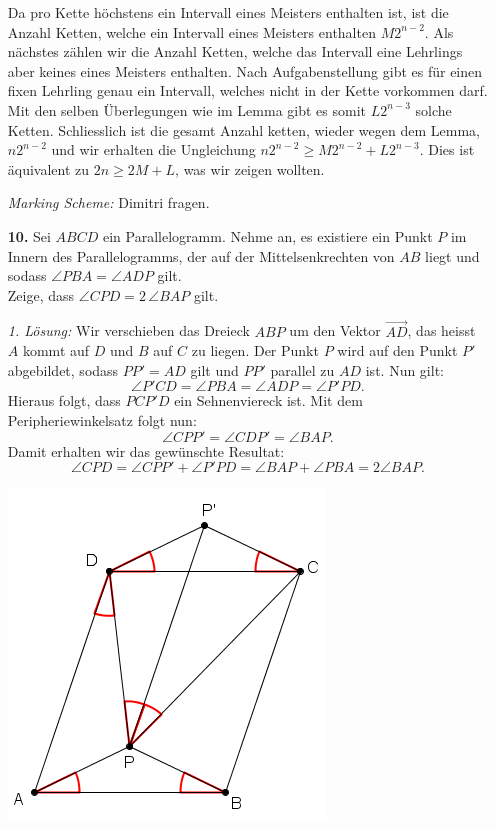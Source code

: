 \documentclass[language=german,style=solution]{smo}
\begin{document}
\begin{enumerate}
Da pro Kette höchstens ein Intervall eines Meisters enthalten ist, ist die Anzahl Ketten, welche ein Intervall eines Meisters enthalten $M2^{n-2}$.
Als nächstes zählen wir die Anzahl Ketten, welche das Intervall eine Lehrlings aber keines eines Meisters enthalten. Nach Aufgabenstellung gibt es für einen fixen Lehrling genau ein Intervall, welches nicht in der Kette vorkommen darf. Mit den selben Überlegungen wie im Lemma gibt es somit $L2^{n-3}$ solche Ketten. Schliesslich ist die gesamt Anzahl ketten, wieder wegen dem Lemma,  $n2^{n-2}$ und wir erhalten die Ungleichung  $n2^{n-2} \geq M2^{n-2}+L2^{n-3}$. Dies ist äquivalent zu $2n \geq 2M +L$, was wir zeigen wollten.

\textit{Marking Scheme:} Dimitri fragen.

\newpage

\item[\textbf{10.}] %
Sei $ABCD$ ein Parallelogramm. Nehme an, es existiere ein Punkt $P$ im Innern des Parallelogramms, der auf der Mittelsenkrechten von $AB$ liegt und sodass $\angle PBA=\angle ADP$ gilt.\\
Zeige, dass $\angle CPD=2 \,\angle BAP$ gilt.

\textit{1. Lösung:}
Wir verschieben das Dreieck $ABP$ um den Vektor $\vec{AD}$, das heisst $A$ kommt auf $D$ und $B$ auf $C$ zu liegen. Der Punkt $P$ wird auf den Punkt $P'$ abgebildet, sodass $PP'=AD$ gilt und $PP'$ parallel zu $AD$ ist. Nun gilt:
\[
\angle P'CD=\angle PBA=\angle ADP=\angle P'PD.
\]
Hieraus folgt, dass $PCP'D$ ein Sehnenviereck ist. Mit dem Peripheriewinkelsatz folgt nun:
\[
\angle CPP'=\angle CDP'=\angle BAP.
\]
Damit erhalten wir das gewünschte Resultat:
\[
\angle CPD=\angle CPP'+\angle P'PD=\angle BAP+\angle PBA=2\angle BAP.
\]

\begin{center}
\includegraphics[width=.5\textwidth]{Muloe10_1}
\end{center}


\end{enumerate}
\end{document}
